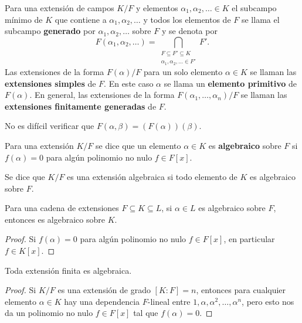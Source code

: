 \begin{definicion}
  Para una extensión de campos $K/F$ y elementos
  $\alpha_1,\alpha_2,\ldots \in K$ el subcampo mínimo de $K$ que contiene a
  $\alpha_1,\alpha_2,\ldots$ y todos los elementos de $F$ se llama el subcampo
  \textbf{generado} por $\alpha_1,\alpha_2,\ldots$ sobre $F$ y se denota por
  \[ F (\alpha_1,\alpha_2,\ldots) =
     \bigcap_{\substack{F \subseteq F' \subseteq K \\ \alpha_1,\alpha_2,\ldots \in F'}} F'. \]
  Las extensiones de la forma $F (\alpha)/F$ para un solo elemento
  $\alpha \in K$ se llaman las \textbf{extensiones simples} de $F$. En este caso
  $\alpha$ se llama un \textbf{elemento primitivo} de $F (\alpha)$.
  En general, las extensiones de la forma $F (\alpha_1,\ldots,\alpha_n)/F$ se
  llaman las \textbf{extensiones finitamente generadas} de $F$.
\end{definicion}

No es difícil verificar que $F (\alpha,\beta) = (F (\alpha)) (\beta)$.

\begin{definicion}
  Para una extensión $K/F$ se dice que un elemento $\alpha \in K$ es
  \textbf{algebraico} sobre $F$ si $f (\alpha) = 0$ para algún polinomio no nulo
  $f \in F [x]$.

  Se dice que $K/F$ es una extensión algebraica si todo elemento de $K$ es
  algebraico sobre $F$.
\end{definicion}

\begin{proposicion}
  Para una cadena de extensiones $F \subseteq K \subseteq L$, si $\alpha \in L$
  es algebraico sobre $F$, entonces es algebraico sobre $K$.

  \begin{proof}
    Si $f (\alpha) = 0$ para algún polinomio no nulo $f \in F [x]$, en
    particular $f \in K [x]$.
  \end{proof}
\end{proposicion}

\begin{proposicion}
  \label{obs:extension-finita-es-algebraica}
  Toda extensión finita es algebraica.

  \begin{proof}
    Si $K/F$ es una extensión de grado $[K : F] = n$, entonces para cualquier
    elemento $\alpha \in K$ hay una dependencia $F$-lineal
    entre $1,\alpha,\alpha^2,\ldots,\alpha^n$, pero esto nos da un polinomio
    no nulo $f \in F[x]$ tal que $f (\alpha) = 0$.
  \end{proof}
\end{proposicion}

